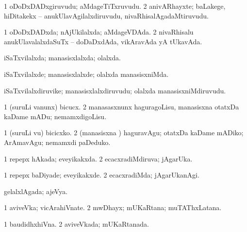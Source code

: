 \bentry
{} 
\gl{\nA}
\expl{}
\bmng
\bnum
\num{1} oDoDxDADxgiruvudu; aMdageTiTxruvudu. 
\num{2} anivARhayxte; baLakege, hiDitakekx -- anukUlavAgilalxdiruvudu, nivaRhisalAgadaMtiruvudu. 
\enum
\emng
\eentry

\bentry
{} 
\gl{\gu}
\bmng
\bnum
\num{1} oDoDxDADxda; nAjUkilalxda; aMdageVDAda. 
\num{2} nivaRhisalu anukUlavalalxdaSuTx -- doDaDxdAda, vikAravAda yA tUkavAda. 
\enum
\emng
\eentry

\bentry
{} 
\gl{\gu}
\expl{}
\bmng
iSaTxvilalxda; manasisxlalxda; olalxda. 
\emng
\eentry

\bentry
{} 
\gl{\kirxvi}
\expl{}
\bmng
iSaTxvilalxde; manasisxlalxde; olalxda manasisxniMda. 
\emng
\eentry

\bentry
{} 
\gl{\nA}
\expl{}
\bmng
iSaTxvilalxdiruvike; manasisxlalxdiruvudu; olalxda manasisxniMdiruvudu. 
\emng
\eentry

\bentry
{} 
\gl{\kirx}


\noindent
\gl{\sakirx}
\expl{}
\bmng
\bnum
\num{1} (suruLi \mo vanunx) bicucx. 
\num{2} manasasxnunx haguragoLisu, manasisxna otatxDa kaDame mADu; nemamxdigoLisu. 
\enum
\emng

\noindent
\gl{\akirx}
\expl{}
\bmng
\bnum
\num{1} (suruLi \mo vu) bicicxko. 
\num{2} (manasisxna \vi) haguravAgu; otatxDa kaDame mADiko; ArAmavAgu; nemamxdi paDeduko. 
\enum
\emng
\eentry

\bentry
{} 
\gl{\gu}
\expl{}
\bmng
\bnum
\num{1} repepx hAkada; eveyikakxda. 
\num{2} ecacxradiMdiruva; jAgarUka. 
\enum
\emng
\eentry

\bentry
{} 
\gl{\kirxvi}
\expl{}
\bmng
\bnum
\num{1} repepx baDiyade; eveyikakxde. 
\num{2} ecacxradiMda; jAgarUkanAgi. 
\enum
\emng
\eentry

\bentry
{} 
\gl{\gu}
\expl{}
\bmng
gelalxlAgada; ajeVya. 
\emng
\eentry

\bentry
{} 
\gl{\nA}
\expl{}
\bmng
\bnum
\num{1} aviveVka; vicArahiVnate. 
\num{2} mwDhayx; mUKaRtana; muTAThxLatana. 
\enum
\emng
\eentry

\bentry
{} 
\gl{\gu}
\expl{}
\bmng
\bnum
\num{1} baudidhxhiVna. 
\num{2} aviveVkada; mUKaRtanada. 
\enum
\emng
\eentry

